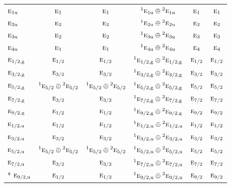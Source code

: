 \documentclass[10pt,a4paper]{article}
\numberwithin{equation}{section}
\newcommand{\irr}[1]{\text{\normalfont\scshape #1}}
\newcommand{\conjpair}[1]{{}^{#1}}
\newcommand{\ptag}[1]{\mathrm{#1}}
\begin{document}
{\begin{longtable}{@{}lccccc@{}}
$\irr{e}_{1\ptag{u}}$ & $\irr{e}_{1}$ & $\irr{e}_{1}$ & $\conjpair{1}\irr{e}_{1\ptag{u}}\oplus \conjpair{2}\irr{e}_{1\ptag{u}}$ & $\irr{e}_{1}$ & $\irr{e}_{1}$\\
$\irr{e}_{2\ptag{u}}$ & $\irr{e}_{2}$ & $\irr{e}_{2}$ & $\conjpair{1}\irr{e}_{2\ptag{u}}\oplus \conjpair{2}\irr{e}_{2\ptag{u}}$ & $\irr{e}_{2}$ & $\irr{e}_{2}$\\
$\irr{e}_{3\ptag{u}}$ & $\irr{e}_{2}$ & $\irr{e}_{2}$ & $\conjpair{1}\irr{e}_{3\ptag{u}}\oplus \conjpair{2}\irr{e}_{3\ptag{u}}$ & $\irr{e}_{3}$ & $\irr{e}_{3}$\\
$\irr{e}_{4\ptag{u}}$ & $\irr{e}_{1}$ & $\irr{e}_{1}$ & $\conjpair{1}\irr{e}_{4\ptag{u}}\oplus \conjpair{2}\irr{e}_{4\ptag{u}}$ & $\irr{e}_{4}$ & $\irr{e}_{4}$\\
$\irr{e}_{1/2,\ptag{g}}$ & $\irr{e}_{1/2}$ & $\irr{e}_{1/2}$ & $\conjpair{1}\irr{e}_{1/2,\ptag{g}}\oplus \conjpair{2}\irr{e}_{1/2,\ptag{g}}$ & $\irr{e}_{1/2}$ & $\irr{e}_{1/2}$\\
$\irr{e}_{3/2,\ptag{g}}$ & $\irr{e}_{3/2}$ & $\irr{e}_{3/2}$ & $\conjpair{1}\irr{e}_{3/2,\ptag{g}}\oplus \conjpair{2}\irr{e}_{3/2,\ptag{g}}$ & $\irr{e}_{3/2}$ & $\irr{e}_{3/2}$\\
$\irr{e}_{5/2,\ptag{g}}$ & $\conjpair{1}\irr{e}_{5/2}\oplus \conjpair{2}\irr{e}_{5/2}$ & $\conjpair{1}\irr{e}_{5/2}\oplus \conjpair{2}\irr{e}_{5/2}$ & $\conjpair{1}\irr{e}_{5/2,\ptag{g}}\oplus \conjpair{2}\irr{e}_{5/2,\ptag{g}}$ & $\irr{e}_{5/2}$ & $\irr{e}_{5/2}$\\
$\irr{e}_{7/2,\ptag{g}}$ & $\irr{e}_{3/2}$ & $\irr{e}_{3/2}$ & $\conjpair{1}\irr{e}_{7/2,\ptag{g}}\oplus \conjpair{2}\irr{e}_{7/2,\ptag{g}}$ & $\irr{e}_{7/2}$ & $\irr{e}_{7/2}$\\
$\irr{e}_{9/2,\ptag{g}}$ & $\irr{e}_{1/2}$ & $\irr{e}_{1/2}$ & $\conjpair{1}\irr{e}_{9/2,\ptag{g}}\oplus \conjpair{2}\irr{e}_{9/2,\ptag{g}}$ & $\irr{e}_{9/2}$ & $\irr{e}_{9/2}$\\
$\irr{e}_{1/2,\ptag{u}}$ & $\irr{e}_{1/2}$ & $\irr{e}_{1/2}$ & $\conjpair{1}\irr{e}_{1/2,\ptag{u}}\oplus \conjpair{2}\irr{e}_{1/2,\ptag{u}}$ & $\irr{e}_{1/2}$ & $\irr{e}_{1/2}$\\
$\irr{e}_{3/2,\ptag{u}}$ & $\irr{e}_{3/2}$ & $\irr{e}_{3/2}$ & $\conjpair{1}\irr{e}_{3/2,\ptag{u}}\oplus \conjpair{2}\irr{e}_{3/2,\ptag{u}}$ & $\irr{e}_{3/2}$ & $\irr{e}_{3/2}$\\
$\irr{e}_{5/2,\ptag{u}}$ & $\conjpair{1}\irr{e}_{5/2}\oplus \conjpair{2}\irr{e}_{5/2}$ & $\conjpair{1}\irr{e}_{5/2}\oplus \conjpair{2}\irr{e}_{5/2}$ & $\conjpair{1}\irr{e}_{5/2,\ptag{u}}\oplus \conjpair{2}\irr{e}_{5/2,\ptag{u}}$ & $\irr{e}_{5/2}$ & $\irr{e}_{5/2}$\\
$\irr{e}_{7/2,\ptag{u}}$ & $\irr{e}_{3/2}$ & $\irr{e}_{3/2}$ & $\conjpair{1}\irr{e}_{7/2,\ptag{u}}\oplus \conjpair{2}\irr{e}_{7/2,\ptag{u}}$ & $\irr{e}_{7/2}$ & $\irr{e}_{7/2}$\\*
$\irr{e}_{9/2,\ptag{u}}$ & $\irr{e}_{1/2}$ & $\irr{e}_{1/2}$ & $\conjpair{1}\irr{e}_{9/2,\ptag{u}}\oplus \conjpair{2}\irr{e}_{9/2,\ptag{u}}$ & $\irr{e}_{9/2}$ & $\irr{e}_{9/2}$\\
\bottomrule\end{longtable}}
\end{document}
